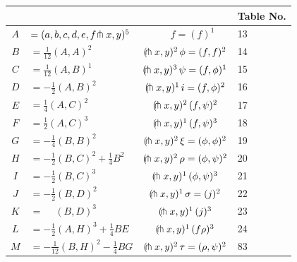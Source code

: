 \documentclass[11pt,a4paper]{article}
\begin{document}
\begin{center}
\begin{tabular}{clcl}
& & & Table No.\\\hline
$A$ & $= (a, b, c, d, e, f\hspace{-0.2em}\pitchfork x, y)^{5}$ & $\phantom{=}\, f = (f)^{1}$ & 13\\[0.3em]
$B$ & $= \frac{1}{12}(A,A)^{2}$ & $(\hspace{-0.2em}\pitchfork x, y)^{2}\, \phi = (f,f)^{2}$ & 14\\[0.3em]
$C$ & $= \frac{1}{12}(A,B)^{1}$ & $(\hspace{-0.2em}\pitchfork x, y)^{3}\, \psi = (f,\phi)^{1}$ & 15\\[0.3em]
$D$ & $= -\frac{1}{2}(A,B)^{2}$ & $(\hspace{-0.2em}\pitchfork x, y)^{1}\, i = (f,\phi)^{2}$ & 16\\[0.3em]
$E$ & $= \frac{1}{4}(A,C)^{2}$ & $(\hspace{-0.2em}\pitchfork x, y)^{2}\, (f,\psi)^{2}$ & 17\\[0.3em]
$F$ & $= \frac{1}{2}(A,C)^{3}$ & $(\hspace{-0.2em}\pitchfork x, y)^{1}\, (f,\psi)^{3}$ & 18\\[0.3em]
$G$ & $= -\frac{1}{4}(B,B)^{2}$ & $(\hspace{-0.2em}\pitchfork x, y)^{2}\, \xi = (\phi,\phi)^{2}$ & 19\\[0.3em]
$H$ & $= -\frac{1}{2}(B,C)^{2} + \frac{1}{4}B^{2}$ & $(\hspace{-0.2em}\pitchfork x, y)^{2}\, \rho = (\phi,\psi)^{2}$ & 20\\[0.3em]
$I$ & $= -\frac{1}{2}(B,C)^{3}$ & $(\hspace{-0.2em}\pitchfork x, y)^{1}\, (\phi,\psi)^{3}$ & 21\\[0.3em]
$J$ & $= -\frac{1}{2}(B,D)^{2}$ & $(\hspace{-0.2em}\pitchfork x, y)^{1}\, \sigma = (j)^{2}$ & 22\\[0.3em]
$K$ & $= \phantom{-}(B,D)^{3}$ & $(\hspace{-0.2em}\pitchfork x, y)^{1}\, (j)^{3}$ & 23\\[0.3em]
$L$ & $= -\frac{1}{2}(A,H)^{3} + \frac{1}{4}BE$ & $(\hspace{-0.2em}\pitchfork x, y)^{1}\, (f\rho)^{3}$ & 24\\[0.3em]
$M$ & $= -\frac{1}{12}(B,H)^{2} - \frac{1}{4}BG$ & $(\hspace{-0.2em}\pitchfork x, y)^{2}\, \tau = (\rho,\psi)^{2}$ & 83\\[0.3em]

\end{tabular}
\end{center}
\end{document}
